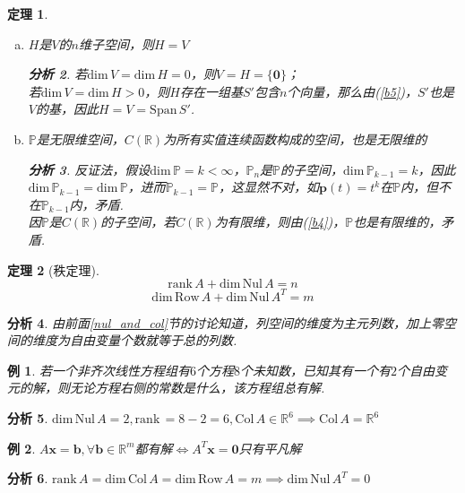 \documentclass[11pt,UTF8]{ctexart}
\newtheorem{theorem}{定理}
\newtheorem{example}{例}%
\newtheorem*{analysis}{分析}
\def\vx{\mathbf{x}}
\def\dim{\mathrm{dim}\,}
\def\rank{\mathrm{rank}\,}
\def\span{\mathrm{Span}\,}
\def\col{\mathrm{Col}\,}
\def\nul{\mathrm{Nul}\,}
\def\row{\mathrm{Row}\,}
\newcommand{\vb}[1]{\mathbf{#1}}
\begin{document}
\begin{theorem}
\begin{enumerate}[(a)]
\begin{analysis}
	\end{analysis}
	\item $H$是$V$的$n$维子空间，则$H=V$
	\begin{analysis}
	若$\dim V=\dim H=0$，则$V=H=\{\vb{0}\}$；\\
	若$\dim V=\dim H>0$，则$H$存在一组基$S'$包含$n$个向量，那么由(\ref{b5})，$S'$也是$V$的基，因此$H=V=\span S'$.
	\end{analysis}
	\item $\mathbb{P}$是无限维空间，$C(\mathbb{R})$为所有实值连续函数构成的空间，也是无限维的
	\begin{analysis}
	反证法，假设$\dim\mathbb{P}=k<\infty$，$\mathbb{P}_n$是$\mathbb{P}$的子空间，$\dim\mathbb{P}_{k-1}=k$，因此$\dim\mathbb{P}_{k-1}=\dim\mathbb{P}$，进而$\mathbb{P}_{k-1}=\mathbb{P}$，这显然不对，如$\vb{p}(t)=t^k$在$\mathbb{P}$内，但不在$\mathbb{P}_{k-1}$内，矛盾.\\
	因$\mathbb{P}$是$C(\mathbb{R})$的子空间，若$C(\mathbb{R})$为有限维，则由(\ref{b4})，$\mathbb{P}$也是有限维的，矛盾.
	\end{analysis}
\end{enumerate}
\end{theorem}
\begin{theorem}[秩定理]
\label{rank_theo}
\[\mathrm{rank}\,A+\mathrm{dim}\,\mathrm{Nul}\,A=n\]
\[\dim\row A+\dim \nul A^T=m\]
\end{theorem}
\begin{analysis}
由前面\ref{nul_and_col}节的讨论知道，列空间的维度为主元列数，加上零空间的维度为自由变量个数就等于总的列数.
\end{analysis}
\begin{example}
若一个非齐次线性方程组有$6$个方程$8$个未知数，已知其有一个有$2$个自由变元的解，则无论方程右侧的常数是什么，该方程组总有解.
\end{example}
\begin{analysis}
$\dim\nul A=2,\rank=8-2=6,\col A\in\mathbb{R}^6\implies\col A=\mathbb{R}^6$
\end{analysis}
\begin{example}
$A\vx=\vb{b},\forall\vb{b}\in\mathbb{R}^m$都有解$\iff A^T\vx=\vb{0}$只有平凡解
\end{example}
\begin{analysis}
$\rank A=\dim\col A=\dim\row A=m\implies\dim\nul A^T=0$
\end{analysis}
\end{document}
